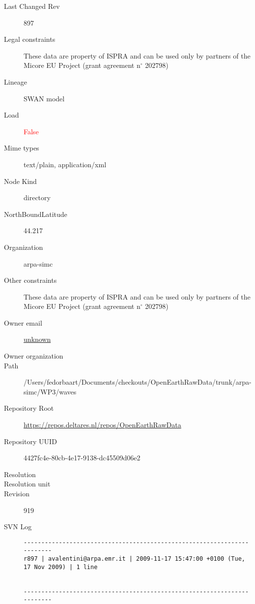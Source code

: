 \documentclass[9]{report}
\begin{document}
\begin{description}
  \item[Last Changed Rev] 897
  \item[Legal constraints] These data are property of ISPRA and can be used only by partners of the Micore EU Project (grant agreement n\mbox{$^\circ$} 202798)
  \item[Lineage] SWAN model
  \item[Load] \textcolor{red}{False}
  \item[Mime types] text/plain, application/xml
  \item[Node Kind] directory
  \item[NorthBoundLatitude] 44.217
  \item[Organization] arpa-simc
  \item[Other constraints] These data are property of ISPRA and can be used only by partners of the Micore EU Project (grant agreement n\mbox{$^\circ$} 202798)
  \item[Owner email] \href{mailto:unknown}{unknown}
  \item[Owner organization] 
  \item[Path] /Users/fedorbaart/Documents/checkouts/OpenEarthRawData/trunk/arpa-simc/WP3/waves
  \item[Repository Root] \href{https://repos.deltares.nl/repos/OpenEarthRawData}{https://repos.deltares.nl/repos/OpenEarthRawData}
  \item[Repository UUID] 4427fc4e-80cb-4e17-9138-dc45509d06e2
  \item[Resolution] 
  \item[Resolution unit] 
  \item[Revision] 919
  \item[SVN Log] \begin{verbatim}
------------------------------------------------------------------------
r897 | avalentini@arpa.emr.it | 2009-11-17 15:47:00 +0100 (Tue, 17 Nov 2009) | 1 line


------------------------------------------------------------------------


\end{verbatim}
\end{description}
\end{document}
